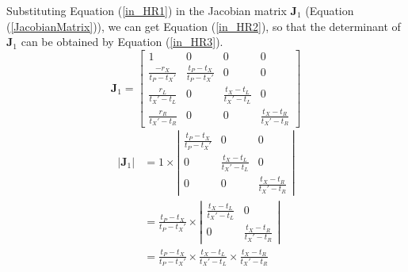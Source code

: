 \documentclass{bmcart}
\begin{document}
\begin{backmatter}
Substituting Equation (\ref{in_HR1}) in the Jacobian matrix ${{\mathbf{J}}_1}$ (Equation (\ref{JacobianMatrix})), we can get Equation (\ref{in_HR2}), so that the determinant of ${{\mathbf{J}}_1}$ can be obtained by Equation (\ref{in_HR3}).
\begin{equation}\label{in_HR2}
{{\mathbf{J}}_1} = \left[ {\begin{array}{*{20}{c}}
  1&0&0&0 \\ 
  {\frac{{ - {r_X}}}{{{t_P} - {t_X}'}}}&{\frac{{{t_P} - {t_X}}}{{{t_P} - {t_X}'}}}&0&0 \\ 
  {\frac{{{r_L}}}{{{t_X}' - {t_L}}}}&0&{\frac{{{t_X} - {t_L}}}{{{t_X}' - {t_L}}}}&0 \\ 
  {\frac{{{r_R}}}{{{t_X}' - {t_R}}}}&0&0&{\frac{{{t_X} - {t_R}}}{{{t_X}' - {t_R}}}} 
\end{array}} \right]
\end{equation}  
\begin{equation}\label{in_HR3}
\begin{aligned}
\left| {{{\mathbf{J}}_1}} \right| &= 1 \times \left| {\begin{array}{*{20}{c}}
  {\frac{{{t_P} - {t_X}}}{{{t_P} - {t_X}'}}}&0&0 \\ 
  0&{\frac{{{t_X} - {t_L}}}{{{t_X}' - {t_L}}}}&0 \\ 
  0&0&{\frac{{{t_X} - {t_R}}}{{{t_X}' - {t_R}}}} 
\end{array}} \right| \\&= \frac{{{t_P} - {t_X}}}{{{t_P} - {t_X}'}} \times \left| {\begin{array}{*{20}{c}}
  {\frac{{{t_X} - {t_L}}}{{{t_X}' - {t_L}}}}&0 \\ 
  0&{\frac{{{t_X} - {t_R}}}{{{t_X}' - {t_R}}}} 
\end{array}} \right| \\&= \frac{{{t_P} - {t_X}}}{{{t_P} - {t_X}'}} \times \frac{{{t_X} - {t_L}}}{{{t_X}' - {t_L}}} \times \frac{{{t_X} - {t_R}}}{{{t_X}' - {t_R}}}
\end{aligned}
\end{equation}  


\end{backmatter}
\end{document}
